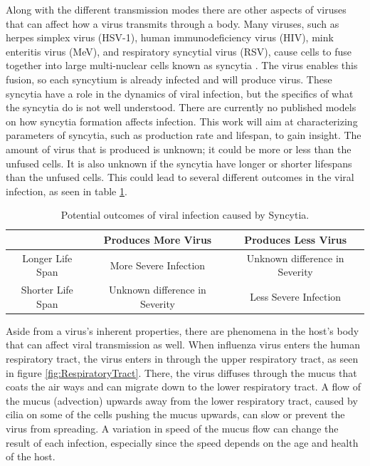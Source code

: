 \documentclass[a4paper]{article}
\begin{document}
Along with the different transmission modes there are other aspects of viruses that can affect how a virus transmits through a body. Many viruses, such as herpes simplex virus (HSV-1), human immunodeficiency virus (HIV), mink enteritis virus (MeV), and respiratory syncytial virus (RSV), cause cells to fuse together into large multi-nuclear cells known as syncytia \cite{Carmichael, Chowdhury, Rozieres, Tian}. The virus enables this fusion, so each syncytium is already infected and will produce virus. These syncytia have a role in the dynamics of viral infection, but the specifics of what the syncytia do is not well understood. There are currently no published models on how syncytia formation affects infection. This work will aim at characterizing parameters of syncytia, such as production rate and lifespan, to gain insight. The amount of virus that is produced is unknown; it could be more or less than the unfused cells. It is also unknown if the syncytia have longer or shorter lifespans than the unfused cells. This could lead to several different outcomes in the viral infection, as seen in table \ref{tab:SyncytiaProduction}.

\begin{table}[h]
    \centering
    \caption{Potential outcomes of viral infection caused by Syncytia.}
    \begin{tabular}{|c|c|c|}
        \hline
          & Produces More Virus & Produces Less Virus\\
        \hline
        Longer Life Span & More Severe Infection & Unknown difference in Severity\\
        \hline
        Shorter Life Span & Unknown difference in Severity & Less Severe Infection\\
        \hline
    \end{tabular}
    \label{tab:SyncytiaProduction}
\end{table}

Aside from a virus's inherent properties, there are phenomena in the host's body that can affect viral transmission as well. When influenza virus enters the human respiratory tract, the virus enters in through the upper respiratory tract, as seen in figure \ref{fig:RespiratoryTract}. There, the virus diffuses through the mucus that coats the air ways and can migrate down to the lower respiratory tract. A flow of the mucus (advection) upwards away from the lower respiratory tract, caused by cilia on some of the cells pushing the mucus upwards, can slow or prevent the virus from spreading. A variation in speed of the mucus flow can change the result of each infection, especially since the speed depends on the age and health of the host.
\end{document}
